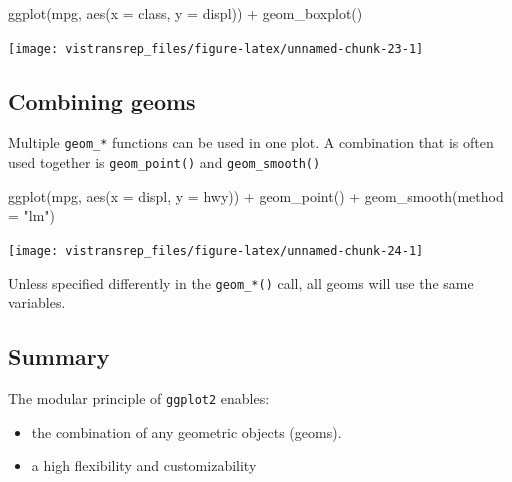 \documentclass[]{book}
\newenvironment{Shaded}{}{}
\newcommand{\DataTypeTok}[1]{#1}
\newcommand{\KeywordTok}[1]{\textcolor[rgb]{0.00,0.00,1.00}{#1}}
\newcommand{\NormalTok}[1]{#1}
\newcommand{\OperatorTok}[1]{#1}
\newcommand{\StringTok}[1]{\textcolor[rgb]{0.00,0.50,0.50}{#1}}
\providecommand{\tightlist}{%
  \setlength{\itemsep}{0pt}\setlength{\parskip}{0pt}}
\begin{document}
\begin{Shaded}
\begin{Highlighting}[]
\KeywordTok{ggplot}\NormalTok{(mpg, }\KeywordTok{aes}\NormalTok{(}\DataTypeTok{x =}\NormalTok{ class, }\DataTypeTok{y =}\NormalTok{ displ)) }\OperatorTok{+}
\StringTok{  }\KeywordTok{geom_boxplot}\NormalTok{()}
\end{Highlighting}
\end{Shaded}

\begin{flushright}\texttt{[image: vistransrep\_files/figure-latex/unnamed-chunk-23-1]} \end{flushright}

\hypertarget{combining-geoms}{%
\subsection{Combining geoms}\label{combining-geoms}}

Multiple \texttt{geom\_*} functions can be used in one plot.
A combination that is often used together is \texttt{geom\_point()} and \texttt{geom\_smooth()}

\begin{Shaded}
\begin{Highlighting}[]
\KeywordTok{ggplot}\NormalTok{(mpg, }\KeywordTok{aes}\NormalTok{(}\DataTypeTok{x =}\NormalTok{ displ, }\DataTypeTok{y =}\NormalTok{ hwy)) }\OperatorTok{+}
\StringTok{  }\KeywordTok{geom_point}\NormalTok{() }\OperatorTok{+}
\StringTok{  }\KeywordTok{geom_smooth}\NormalTok{(}\DataTypeTok{method =} \StringTok{"lm"}\NormalTok{)}
\end{Highlighting}
\end{Shaded}

\begin{flushright}\texttt{[image: vistransrep\_files/figure-latex/unnamed-chunk-24-1]} \end{flushright}

Unless specified differently in the \texttt{geom\_*()} call, all geoms will use the same variables.

\hypertarget{summary}{%
\subsection{Summary}\label{summary}}

The modular principle of \texttt{ggplot2} enables:

\begin{itemize}
\tightlist
\item
  the combination of any geometric objects (geoms).
\item
  a high flexibility and customizability
\end{itemize}
\end{document}
